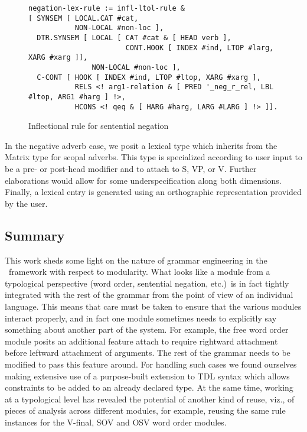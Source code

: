 \begin{figure}[ht]
{\scriptsize
\begin{verbatim}
negation-lex-rule := infl-ltol-rule &
[ SYNSEM [ LOCAL.CAT #cat,
           NON-LOCAL #non-loc ],
  DTR.SYNSEM [ LOCAL [ CAT #cat & [ HEAD verb ],
                       CONT.HOOK [ INDEX #ind, LTOP #larg, XARG #xarg ]],
               NON-LOCAL #non-loc ],
  C-CONT [ HOOK [ INDEX #ind, LTOP #ltop, XARG #xarg ],
           RELS <! arg1-relation & [ PRED '_neg_r_rel, LBL #ltop, ARG1 #harg ] !>,
           HCONS <! qeq & [ HARG #harg, LARG #LARG ] !> ]].
\end{verbatim}
}
\caption{Inflectional rule for sentential negation}
\label{negrulefig}
\end{figure}

In the negative adverb case, we posit a lexical type which inherits
from the Matrix type for scopal adverbs.  This type is specialized
according to user input to be a pre- or post-head modifier and to
attach to S, VP, or V.  Further elaborations would allow for some
underspecification along both dimensions.  Finally, a lexical entry is
generated using an orthographic representation
provided by the user.

\subsection{Summary}

This work sheds some light on the nature of grammar engineering in the
\hpsg\ framework with respect to modularity.  What looks like a module
from a typological perspective (word order, sentential negation,
etc.)\ is in fact tightly integrated with the rest of the grammar from
the point of view of an individual language.  
This means that care must be taken to ensure that the various
modules interact properly, and in fact one module sometimes needs to
explicitly say something about another part of the system.  For
example, the free word order module posits an additional feature {\sc
attach} to require rightward attachment before leftward attachment of
arguments.  The rest of the grammar needs to be modified to pass this
feature around.  For handling such cases we found ourselves making
extensive use of a purpose-built extension to TDL syntax which allows
constraints to be added to an already declared type.  At the same
time, working at a typological level has revealed 
the potential of another kind of reuse, viz., of
pieces of analysis across
different modules, for example, reusing the same rule instances for
the V-final, SOV and OSV word order modules.


